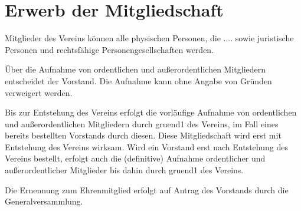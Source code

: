 \documentclass{article}
\begin{document}
\section{Erwerb der Mitgliedschaft}
\begin{absatz}
    \item Mitglieder des Vereins können alle physischen Personen, die
    ....
    sowie juristische Personen und rechtsfähige Personengesellschaften
    werden.
    \item Über die Aufnahme von ordentlichen und außerordentlichen Mitgliedern entscheidet der Vorstand. Die Aufnahme kann ohne Angabe von Gründen verweigert werden.
    \item Bis zur Entstehung des Vereins erfolgt die vorläufige Aufnahme von ordentlichen und außerordentlichen Mitgliedern durch \gls{gruend1} des Vereins, im Fall eines bereits bestellten Vorstands durch diesen. Diese Mitgliedschaft wird erst mit Entstehung des Vereins wirksam. Wird ein Vorstand erst nach Entstehung des Vereins bestellt, erfolgt auch die (definitive) Aufnahme ordentlicher und außerordentlicher Mitglieder bis dahin durch \gls{gruend1} des Vereins.
    \item Die Ernennung zum Ehrenmitglied erfolgt auf Antrag des Vorstands durch die Generalversammlung.
\end{absatz}
\end{document}
